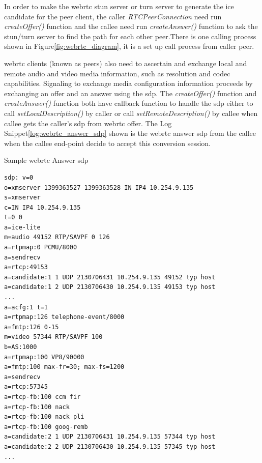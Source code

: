 \par In order to make the \gls{webrtc} \gls{stun} server or \gls{turn} server to generate the \gls{ice} candidate for the peer client, the caller \textit{RTCPeerConnection} need run \textit{createOffer()} function and the callee need run \textit{createAnswer()} function  to ask the \gls{stun}/\gls{turn} server to find the path for each other peer.There is one calling process shown in Figure\ref{fig:webrtc_diagram}, it is a set up call process from caller peer.

\par \gls{webrtc} clients (known as peers) also need to ascertain and exchange local and remote audio and video media information, such as resolution and codec capabilities. Signaling to exchange media configuration information proceeds by exchanging an offer and an answer using the \gls{sdp}. The \textit{createOffer()} function and \textit{createAnswer()} function both have callback function to handle the \gls{sdp} either to call \textit{setLocalDescription()} by caller or call \textit{setRemoteDescription()} by callee when callee gets the caller's \gls{sdp} from \gls{webrtc} offer. The Log Snippet\ref{log:webrtc_answer_sdp} shown is the \gls{webrtc} answer \gls{sdp} from the callee when the callee end-point decide to accept this conversion session.

\begin{algorithm}[h]
  \caption{Sample \gls{webrtc} Answer \gls{sdp}}
  \label{log:webrtc_answer_sdp}
  \begin{verbatim}
sdp: v=0
o=xmserver 1399363527 1399363528 IN IP4 10.254.9.135
s=xmserver
c=IN IP4 10.254.9.135
t=0 0
a=ice-lite
m=audio 49152 RTP/SAVPF 0 126
a=rtpmap:0 PCMU/8000
a=sendrecv
a=rtcp:49153
a=candidate:1 1 UDP 2130706431 10.254.9.135 49152 typ host
a=candidate:1 2 UDP 2130706430 10.254.9.135 49153 typ host
...
a=acfg:1 t=1
a=rtpmap:126 telephone-event/8000
a=fmtp:126 0-15
m=video 57344 RTP/SAVPF 100
b=AS:1000
a=rtpmap:100 VP8/90000
a=fmtp:100 max-fr=30; max-fs=1200
a=sendrecv
a=rtcp:57345
a=rtcp-fb:100 ccm fir
a=rtcp-fb:100 nack
a=rtcp-fb:100 nack pli
a=rtcp-fb:100 goog-remb
a=candidate:2 1 UDP 2130706431 10.254.9.135 57344 typ host
a=candidate:2 2 UDP 2130706430 10.254.9.135 57345 typ host
...
 \end{verbatim}
\end{algorithm}
